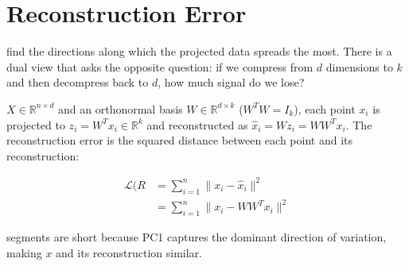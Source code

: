 \newpage
\section{Reconstruction Error}

 find the directions 
along which the projected data spreads the most.
There is a dual view that asks the opposite question: 
if we compress from $d$ dimensions to $k$ and then decompress back to $d$, how much signal do we lose?

 $X \in \mathbb{R}^{n \times d}$ and an orthonormal basis $W \in \mathbb{R}^{d \times k}$ ($W^T W = I_k$), each point $x_i$ is projected to $z_i = W^T x_i \in \mathbb{R}^k$ and reconstructed as $\hat{x}_i = W z_i = W W^T x_i$.
The reconstruction error is the squared distance between each point and its reconstruction:

\begin{align*}
    \mathcal{L}(R &= \sum_{i=1}^n \|x_i - \hat{x}_i\|^2 \\
                   &= \sum_{i=1}^n \|x_i - W W^T x_i\|^2
\end{align*}

 segments are short because PC1 captures the dominant 
direction of variation, making $x$ and its reconstruction similar.


